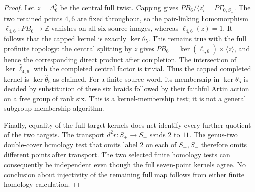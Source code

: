 \begin{proof}
Let $z=\Delta_6^2$ be the central full twist.
Capping gives $PB_6/\langle z\rangle=P\Gamma_{0,S_+}$.
The two retained points $4,6$ are fixed throughout, so
the pair-linking homomorphism $\ell_{4,6}:PB_6\to\mathbb Z$
vanishes on all six source images, whereas
$\ell_{4,6}(z)=1$.
It follows that the capped kernel is exactly
$\ker\theta_5$.
This remains true with the full profinite topology:
the central splitting by $z$ gives
$PB_6=\ker(\ell_{4,6})\times\langle z\rangle$,
and hence the corresponding direct product after completion.
The intersection of $\ker\widehat\ell_{4,6}$ with the
completed central factor is trivial.
Thus the capped completed kernel is
$\ker\widehat\theta_5$ as claimed.
For a finite source word, its membership in
$\ker\theta_5$ is decided by substitution of these six
braids followed by their faithful Artin action on a free
group of rank six.  This is a kernel-membership test;
it is not a general subgroup-membership algorithm.

Finally, equality of the full target kernels does not
identify every further quotient of the two targets.
The transport $d^2r:S_+\to S_-$ sends $2$ to $11$.
The genus-two double-cover homology test that omits
label $2$ on each of $S_+,S_-$ therefore omits different
points after transport.  The two selected finite homology
tests can consequently be independent even though the
full seven-point kernels agree.  No conclusion about
injectivity of the remaining full map follows from either
finite homology calculation.
\end{proof}
